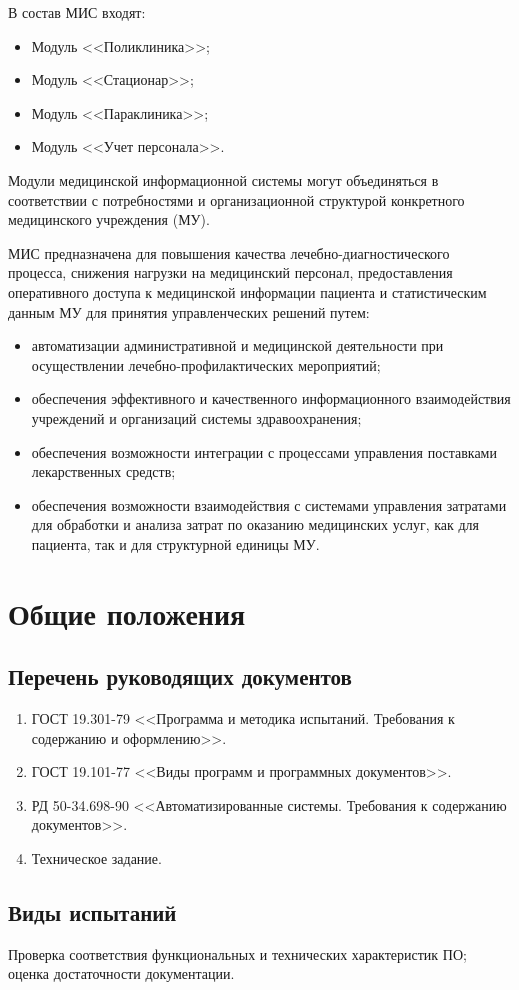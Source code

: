 В состав МИС входят:
\begin{itemize}
\item Модуль <<Поликлиника>>; 
\item Модуль <<Стационар>>; 
\item Модуль <<Параклиника>>;
\item Модуль <<Учет персонала>>.
\end{itemize}
Модули медицинской информационной системы могут объединяться в соответствии с потребностями и организационной структурой конкретного  медицинского учреждения (МУ). 

МИС предназначена для повышения качества лечебно-диагностического процесса, снижения нагрузки на медицинский персонал, предоставления оперативного доступа к медицинской информации пациента и статистическим данным МУ для принятия управленческих решений путем:
\begin{itemize}
\item автоматизации административной и медицинской деятельности при осуществлении лечебно-профилактических мероприятий;
\item обеспечения эффективного и качественного информационного взаимодействия учреждений и организаций системы здравоохранения;
\item обеспечения возможности интеграции с процессами управления поставками лекарственных средств;
\item обеспечения возможности взаимодействия с системами управления затратами для обработки и анализа затрат по оказанию медицинских услуг, как для пациента, так и для структурной единицы МУ. 
\end{itemize}
 
\section{Общие положения}
\subsection{Перечень руководящих документов}
\begin{enumerate}
\item ГОСТ 19.301-79 <<Программа и методика испытаний. Требования к содержанию и оформлению>>.
\item ГОСТ 19.101-77 <<Виды программ и программных документов>>.
\item  РД 50-34.698-90 <<Автоматизированные системы. Требования к содержанию документов>>.
\item Техническое задание.
\end{enumerate}

\subsection{Виды испытаний}
Проверка соответствия функциональных и технических характеристик ПО;
оценка достаточности документации.
 


